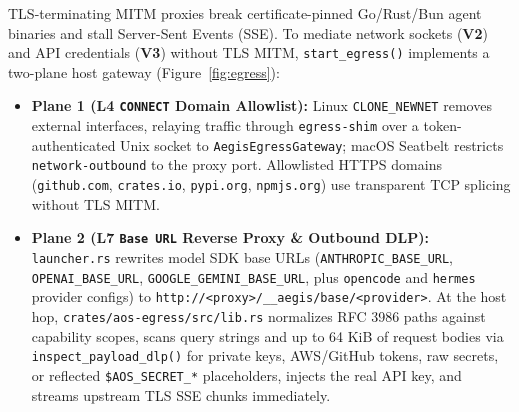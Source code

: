 \documentclass[10pt,journal,compsoc]{IEEEtran}
\begin{document}
TLS-terminating MITM proxies break certificate-pinned Go/Rust/Bun agent binaries and stall Server-Sent Events (SSE). To mediate network sockets (\textbf{V2}) and API credentials (\textbf{V3}) without TLS MITM, \texttt{start\_egress()} implements a two-plane host gateway (Figure~\ref{fig:egress}):
\begin{itemize}
    \item \textbf{Plane 1 (L4 \texttt{CONNECT} Domain Allowlist):} Linux \texttt{CLONE\_NEWNET} removes external interfaces, relaying traffic through \texttt{egress-shim} over a token-authenticated Unix socket to \texttt{AegisEgressGateway}; macOS Seatbelt restricts \texttt{network-outbound} to the proxy port. Allowlisted HTTPS domains (\texttt{github.com}, \texttt{crates.io}, \texttt{pypi.org}, \texttt{npmjs.org}) use transparent TCP splicing without TLS MITM.
    \item \textbf{Plane 2 (L7 \texttt{Base URL} Reverse Proxy \& Outbound DLP):} \texttt{launcher.rs} rewrites model SDK base URLs (\texttt{ANTHROPIC\_BASE\_URL}, \texttt{OPENAI\_BASE\_URL}, \texttt{GOOGLE\_GEMINI\_BASE\_URL}, plus \texttt{opencode} and \texttt{hermes} provider configs) to \texttt{http://<proxy>/\allowbreak\_\_aegis/\allowbreak base/\allowbreak <provider>}. At the host hop, \texttt{crates/\allowbreak aos-egress/\allowbreak src/\allowbreak lib.rs} normalizes RFC 3986 paths against capability scopes, scans query strings and up to 64 KiB of request bodies via \texttt{inspect\_\allowbreak payload\_\allowbreak dlp()} for private keys, AWS/GitHub tokens, raw secrets, or reflected \texttt{\$AOS\_\allowbreak SECRET\_*} placeholders, injects the real API key, and streams upstream TLS SSE chunks immediately.
\end{itemize}
\end{document}
